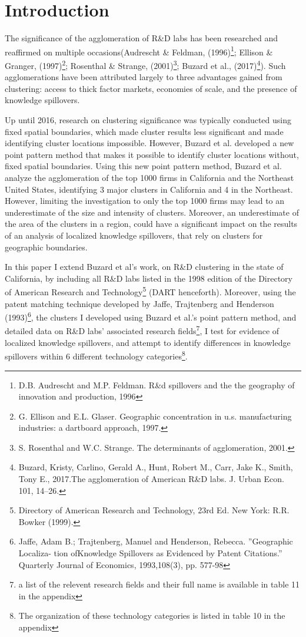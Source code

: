 \documentclass[12pt,letterpaper]{article}
\begin{document}
\section{Introduction}
The significance of the agglomeration of R\&D labs has been researched and reaffirmed on multiple occasions(Audrescht \& Feldman, (1996)\footnote{D.B. Audrescht and M.P. Feldman. R&d spillovers and the the geography of innovation and production,
1996}; Ellison \& Granger, (1997)\footnote{G. Ellison and E.L. Glaser. Geographic concentration in u.s. manufacturing industries: a dartboard
approach, 1997.}; Rosenthal \& Strange, (2001)\footnote{ S. Rosenthal and W.C. Strange. The determinants of agglomeration, 2001.};  Buzard et al., (2017)\footnote{Buzard, Kristy, Carlino, Gerald A., Hunt, Robert M., Carr, Jake K., Smith, Tony E., 2017.The agglomeration of American R&D labs. J. Urban Econ. 101, 14–26.}). Such agglomerations have been attributed largely to three advantages gained from clustering: access to thick factor markets, economies of scale, and the presence of knowledge spillovers. 
\par
Up until 2016, research on clustering significance was typically conducted using fixed spatial boundaries, which made cluster results less significant and made identifying cluster locations impossible. However, Buzard et al. developed a new point pattern method that makes it possible to identify cluster locations without, fixed spatial boundaries. Using this new point pattern method, Buzard et al. analyze the agglomeration of the top 1000 firms in California and the Northeast United States, identifying 3 major clusters in California and 4 in the Northeast. However, limiting the investigation to only the top 1000 firms may lead to an underestimate of the size and intensity of clusters. Moreover, an underestimate of the area of the clusters in a region, could have a significant impact on the results of an analysis of localized knowledge spillovers, that rely on clusters for geographic boundaries. 
\par
In this paper I extend Buzard et al's work, on R\&D clustering in the state of California, by including all R\&D labs listed in the 1998 edition of the Directory of American Research and Technology\footnote{Directory of American Research and Technology, 23rd Ed. New York: R.R. Bowker (1999).} (DART henceforth). Moreover, using the patent matching technique developed by Jaffe, Trajtenberg and Henderson (1993)\footnote{Jaffe, Adam B.; Trajtenberg, Manuel and Henderson, Rebecca. ”Geographic Localiza- tion ofKnowledge Spillovers as Evidenced by Patent Citations.” Quarterly Journal of Economics, 1993,108(3), pp. 577-98}, the clusters I developed using Buzard et al.'s point pattern method, and detailed data on R\&D labs' associated research fields\footnote{a list of the relevent research fields and their full name is available in table 11 in the appendix}, I test for evidence of localized knowledge spillovers, and attempt to identify differences in knowledge spillovers within 6 different technology categories\footnote{The organization of these technology categories is listed in table 10 in the appendix}. 
\end{document}
